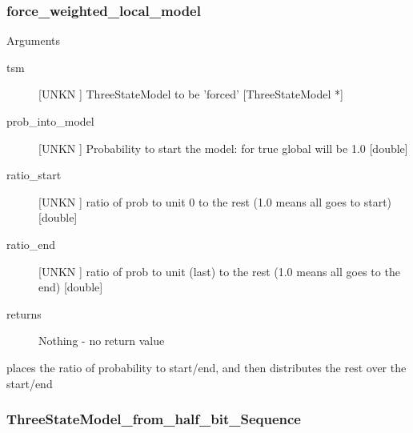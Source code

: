 \subsubsection{force_weighted_local_model}

Arguments
\begin{description}
\item[tsm] [UNKN ] ThreeStateModel to be 'forced' [ThreeStateModel *]
\item[prob_into_model] [UNKN ] Probability to start the model: for true global will be 1.0 [double]
\item[ratio_start] [UNKN ] ratio of prob to unit 0 to the rest (1.0 means all goes to start) [double]
\item[ratio_end] [UNKN ] ratio of prob to unit (last) to the rest (1.0 means all goes to the end) [double]
\item[returns] Nothing - no return value
\end{description}
places the ratio of probability to start/end,
and then distributes the rest over the start/end




\subsubsection{ThreeStateModel_from_half_bit_Sequence}

